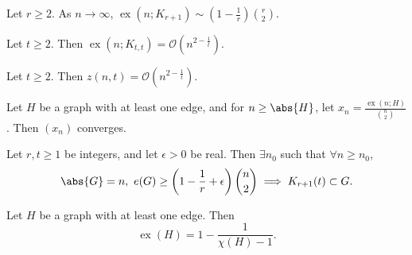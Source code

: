 \documentclass{article}
\DeclareMathOperator{\ext}{ex}
\begin{document}
\begin{ncor}\label{cor:10}
    Let $r \geq 2$. As $n \to \infty$, $\ext(n; K_{r+1}) \sim (1 - \frac{1}{r}) \binom{r}{2}$.
\end{ncor}












\begin{nthm}\label{thm:11}
    Let $t \geq 2$. Then $\ext(n; K_{t,t}) = \mathcal{O}\left(n^{2 - \frac{1}{t}}\right)$.
\end{nthm}








\begin{nthm}\label{thm:12}
    Let $t \geq 2$. Then $z(n, t)  = \mathcal{O}(n^{2 - \frac{1}{t}})$.
\end{nthm}







\begin{nprop}\label{prop:13}
    Let $H$ be a graph with at least one edge, and for $n \geq \abs{H}$, let $x_n = \frac{\ext(n; H)}{\binom{n}{2}}$. Then $(x_n)$ converges.
\end{nprop}





\begin{nthm}\label{thm:14}
    Let $r, t \geq 1$ be integers, and let $\epsilon > 0$ be real.
    Then $\exists n_0$ such that $\forall n \geq n_0$,
    \begin{equation*}
        \abs{G} = n,\ e(G) \geq \left(1 - \frac{1}{r} + \epsilon\right) \binom{n}{2} \implies K_{r+1}(t) \subset G.
    \end{equation*}
\end{nthm}





\begin{ncor}\label{cor:15}
    Let $H$ be a graph with at least one edge. Then
    \begin{equation*}
        \ext(H) = 1 - \frac{1}{\chi(H) - 1}.
    \end{equation*}
\end{ncor}
\end{document}
